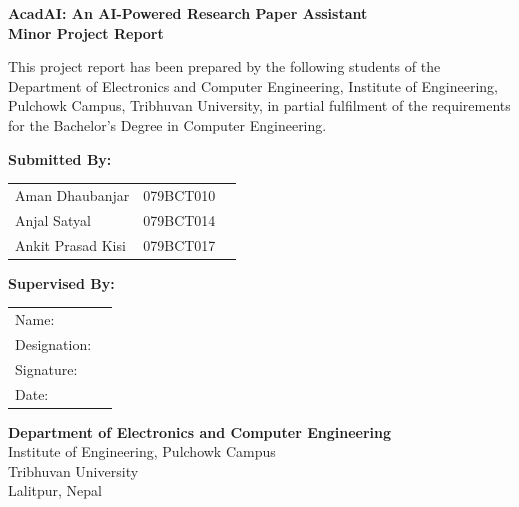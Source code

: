 \documentclass[12pt,a4paper]{report}
\begin{document}
\begin{center}
    {\large \textbf{AcadAI: An AI-Powered Research Paper Assistant}}\\[0.5cm]
    {\large \textbf{Minor Project Report}}\\[1cm]
\end{center}

\noindent This project report has been prepared by the following students of the
Department of Electronics and Computer Engineering, Institute of Engineering,
Pulchowk Campus, Tribhuvan University, in partial fulfilment of the requirements
for the Bachelor's Degree in Computer Engineering.

\vspace{1cm}

\noindent \textbf{Submitted By:}\\[0.3cm]
\begin{tabular}{lll}
    Aman Dhaubanjar   & 079BCT010 & \underline{\hspace{5cm}} \\[0.6cm]
    Anjal Satyal      & 079BCT014 & \underline{\hspace{5cm}} \\[0.6cm]
    Ankit Prasad Kisi & 079BCT017 & \underline{\hspace{5cm}} \\
\end{tabular}

\vspace{1.5cm}

\noindent \textbf{Supervised By:}\\[0.3cm]
\begin{tabular}{ll}
    Name:       & \underline{\hspace{7cm}} \\[0.6cm]
    Designation: & \underline{\hspace{7cm}} \\[0.6cm]
    Signature:  & \underline{\hspace{7cm}} \\[0.6cm]
    Date:       & \underline{\hspace{7cm}} \\
\end{tabular}

\vspace{1.5cm}

\noindent \textbf{Department of Electronics and Computer Engineering}\\
Institute of Engineering, Pulchowk Campus\\
Tribhuvan University\\
Lalitpur, Nepal
\end{document}
